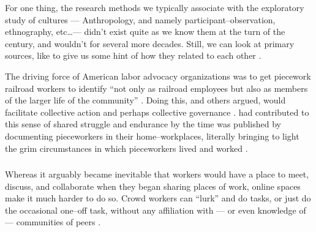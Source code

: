 \documentclass[trackingWork]{subfiles}
\begin{document}
For one thing, the research methods we typically associate with the exploratory study of cultures
--- Anthropology, and namely participant--observation, ethnography, etc\dots ---
didn't exist quite as we know them at the turn of the  century, and
wouldn't for several more decades.
Still, we can look at primary sources, like 
to give us some hint of how they related to each other
\cite{american1921problem}.


The driving force of American labor advocacy organizations was to get piecework railroad workers
to identify
``not only as railroad employees but also as members of the larger life of the community''
\cite{american1921problem}.
Doing this, 
\citeauthor{ostrom1990governing} and others argued,
would facilitate collective action and perhaps collective governance
\cite{ostrom1990governing,russell1982collective,olsonlogic}.
\citeauthor{riisOtherSideLives} had contributed to this sense of shared struggle and endurance
by the time  was published
by documenting pieceworkers in their home--workplaces,
literally bringing to light the grim circumstances in which pieceworkers lived and worked
\cite{riisOtherSideLives}.




\subsubsection{\whatchanged}
Whereas it arguably became inevitable that workers would have a place to
meet, discuss, and collaborate
when they began sharing places of work,
online spaces make it much harder to do so.
Crowd workers can ``lurk'' and do tasks, or just do the occasional one--off task,
without any affiliation with
--- or even knowledge of ---
communities of peers
\cite{miller2011understanding,mcinnis2016one,earl2011digitally}.
\end{document}
